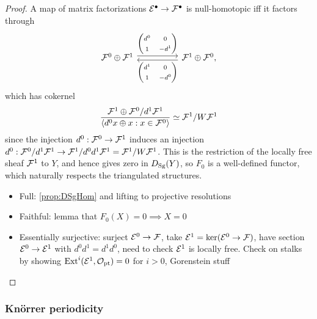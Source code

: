 \begin{proof}
    A map of matrix factorizations $\mathcal{E}^\bullet\to\mathcal{F}^\bullet$ is
    null-homotopic iff it factors through
    \begin{equation*}
        \begin{tikzcd}[ampersand replacement=\&,column sep=huge]
            \calF^0\oplus\calF^1 \ar[shift left]{r}{\begin{pmatrix}
                    d^0 & 0 \\ 1 & -d^1
            \end{pmatrix}} \&
            \calF^1\oplus\calF^0, \ar[shift left]{l}{\begin{pmatrix}
                    d^1 & 0 \\ 1 & -d^0
            \end{pmatrix}}
        \end{tikzcd}
    \end{equation*}
    which has cokernel
    \begin{equation*}
        \frac{\mathcal{F}^1\oplus\mathcal{F}^0/d^1\mathcal{F}^1}
            {\langle d^0x\oplus x : x\in\mathcal{F}^0\rangle}
            \simeq \mathcal{F}^1/W\mathcal{F}^1
    \end{equation*}
    since the injection $d^0:\mathcal{F}^0\to\mathcal{F}^1$ induces an injection
    $d^0:\mathcal{F}^0/d^1\mathcal{F}^1\to\mathcal{F}^1/d^0d^1\mathcal{F}^1=\mathcal{F}^1/W\mathcal{F}^1$. This is
    the restriction of the locally free sheaf $\mathcal{F}^1$ to $Y$, and hence gives
    zero in $D_{\mathrm{Sg}}(Y)$, so $F_0$ is a well-defined functor, which naturally
    respects the triangulated structures.


    \begin{itemize}
        \item Full: \ref{prop:DSgHom} and lifting to projective resolutions
        \item Faithful: lemma that $F_0(X)=0\implies X=0$
        \item Essentially surjective: surject $\mathcal{E}^0\to\mathcal{F}$, take
            $\mathcal{E}^1=\ker(\mathcal{E}^0\to\mathcal{F})$, have section $\mathcal{E}^0\to\mathcal{E}^1$
            with $d^0d^1=d^1d^0$, need to check $\mathcal{E}^1$ is locally free. Check
            on stalks by showing $\operatorname{Ext}^i(\mathcal{E}^1,\mathcal{O}_{\mathrm{pt}})=0$ for $i>0$, Gorenstein
            stuff
    \end{itemize}
\end{proof}

\subsubsection{Kn\"orrer periodicity}

